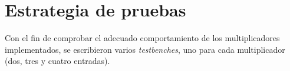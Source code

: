 \newpage
\section{Estrategia de pruebas}

\par Con el fin de comprobar el adecuado comportamiento de los multiplicadores implementados, se escribieron varios \textit{testbenches}, uno para cada multiplicador (dos, tres y cuatro entradas).
\\

